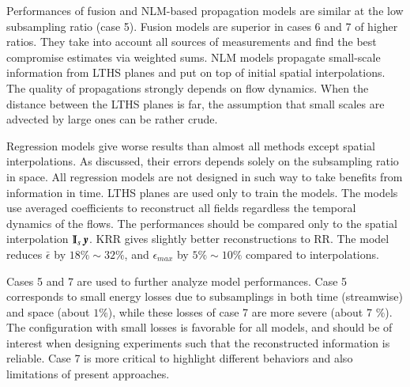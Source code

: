 Performances of fusion and NLM-based propagation models are similar at the low subsampling ratio (case 5). Fusion models are superior in cases 6 and 7 of higher ratios. They take into account all sources of measurements and find the best compromise estimates via weighted sums. NLM models propagate small-scale information from LTHS planes and put on top of initial spatial interpolations. The quality of propagations strongly depends on flow dynamics. When the distance between the LTHS planes is far, the assumption that small scales are advected by large ones can be rather crude.

Regression models give worse results than almost all methods except spatial interpolations. As discussed, their errors depends solely on the subsampling ratio in space. All regression models are not designed in such way to take benefits from information in time. LTHS planes are used only to train the models. The models use averaged coefficients to reconstruct all fields regardless the temporal dynamics of the flows. The performances should be compared only to the spatial interpolation $ \Interp_s \y $. KRR gives slightly better reconstructions to RR. The model reduces $ \bar{\epsilon} $ by $ 18\% \sim 32\% $, and $ \epsilon_{max} $ by $ 5\% \sim 10\% $ compared to interpolations. 

Cases 5 and 7 are used to further analyze model performances. Case 5 corresponds to small energy losses due to subsamplings in both time (streamwise) and space (about $ 1 \% $), while these losses of case 7 are more severe (about 7 $ \% $). The configuration with small losses is favorable for all models, and should be of interest when designing experiments such that the reconstructed information is reliable. Case 7 is more critical to highlight different behaviors and also limitations of present approaches.

